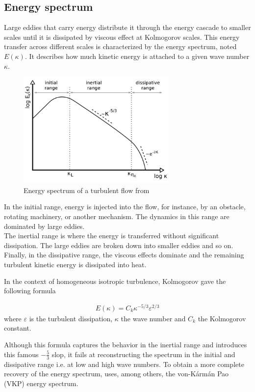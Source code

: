 \documentclass[a4paper,12pt]{article}
\theoremstyle{definition}
\begin{document}
\subsection{Energy spectrum}
Large eddies that carry energy distribute it through the energy cascade to smaller scales until it is dissipated by viscous effect at Kolmogorov scales. 
This energy transfer across different scales is characterized by the energy spectrum, noted $E(\kappa)$. It describes how much kinetic energy is attached to a given wave number $\kappa$. 
\begin{figure}[H]
    \centering
    \includegraphics[width=0.7\textwidth]{illustrations/energy-spectrum-example.png}
    \caption{Energy spectrum of a turbulent flow from \cite{phdthesisRies}}
\end{figure}

In the initial range, energy is injected into the flow, for instance, by an obstacle, rotating machinery, or another mechanism. The dynamics in this range are dominated by large eddies. \\
The inertial range is where the energy is transferred without significant dissipation. The large eddies are broken down into smaller eddies and so on.  Finally, in the dissipative range, the viscous effects dominate and the remaining turbulent kinetic energy is dissipated into heat.


\bigskip

In the context of homogeneous isotropic turbulence, Kolmogorov gave the following formula  

\begin{align}
    E(\kappa) = C_k \kappa^{-5/3}\varepsilon^{2/3}
\end{align}
where $\varepsilon$ is the turbulent dissipation, $\kappa$ the wave number and $C_k$ the Kolmogorov constant.

Although this formula captures the behavior in the inertial range and introduces this famous $-\frac{5}{3}$ slop, it fails at reconstructing the spectrum in the initial and dissipative range i.e. at low and high wave numbers. To obtain a more complete recovery of the energy spectrum, \cite{Janin2021} uses, among others, the von-Kármán Pao (VKP) energy spectrum.
\bigskip
\end{document}
